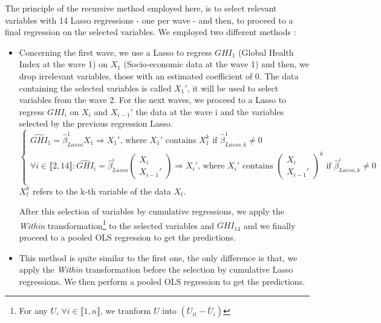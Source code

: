 \documentclass[]{article}
\begin{document}
\noindent
The principle of the recursive method employed here, is to select relevant variables with 14 Lasso regressions - one per wave - and then, to proceed to a final regression on the selected variables. We employed two different methods :
\begin{itemize}
    \item Concerning the first wave, we use a Lasso to regress $GHI_1$ (Global Health Index at the wave 1) on $X_1$ (Socio-economic data at the wave 1) and then, we drop irrelevant variables, those with an estimated coefficient of 0. The data containing the selected variables is called $X_1'$, it will be used to select variables from the wave 2. For the next waves, we proceed to a Lasso to regress $GHI_i$ on $X_i$ and $X_{i-1}'$ the data at the wave i and the variables selected by the previous regression Lasso. $$\left\{
    \begin{array}{lll}
        \widehat{GHI}_{1} = \widehat{\beta}_{Lasso}^1 {X}_{1} \Longrightarrow {X}_{1}' \text{, where } {X}_{1}' \text{ contains } {X}_{1}^k \text{ if } \widehat{\beta}_{Lasso, k}^1 \ne 0 \\
    \forall i \in \llbracket2,14\rrbracket : \widehat{GHI}_{i} = \widehat{\beta}_{Lasso}^i \begin{pmatrix}
         {X}_{i}\\
        {X}_{i-1}'
    \end{pmatrix} \Longrightarrow {X}_{i}' \text{, where } {X}_{i}' \text{ contains } \begin{pmatrix}
         {X}_{i}\\
        {X}_{i-1}'
    \end{pmatrix}^k \text{ if } \widehat{\beta}_{Lasso, k}^i \ne 0\\
    \end{array}
\right.$$ ${X}_{t}^k$ refers to the k-th variable of the data ${X}_{t}$.

After this selection of variables by cumulative regressions, we apply the \textit{Within} transformation\footnote{For any $U$,  $\forall i \in \llbracket1,n\rrbracket$, we tranform $U$ into $(U_{it} -\overline{U}_i )$} to the selected variables and $GHI_{14}$ and we finally proceed to a pooled OLS regression to get the predictions.

    \item This method is quite similar to the first one, the only difference is that, we apply the \textit{Within} transformation before the selection by cumulative Lasso regressions. We then perform a pooled OLS regression to get the predictions.
\end{itemize}
\end{document}
